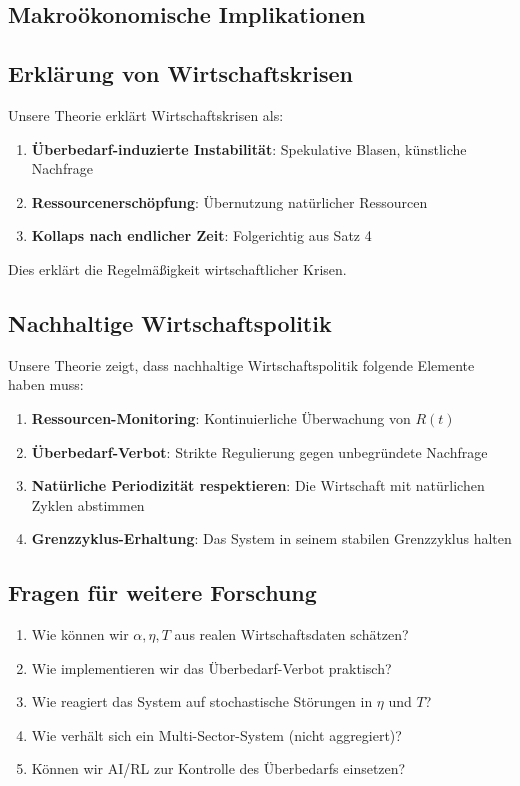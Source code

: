 \documentclass[a4paper, 12pt, twoside, openright]{report}
\theoremstyle{definition}
\theoremstyle{definition}
\begin{document}
\subsection{Makroökonomische Implikationen}

\subsection{Erklärung von Wirtschaftskrisen}

Unsere Theorie erklärt Wirtschaftskrisen als:

\begin{enumerate}
    \item \textbf{Überbedarf-induzierte Instabilität}: Spekulative Blasen, künstliche Nachfrage
    \item \textbf{Ressourcenerschöpfung}: Übernutzung natürlicher Ressourcen
    \item \textbf{Kollaps nach endlicher Zeit}: Folgerichtig aus Satz 4
\end{enumerate}

Dies erklärt die Regelmäßigkeit wirtschaftlicher Krisen.

\subsection{Nachhaltige Wirtschaftspolitik}

Unsere Theorie zeigt, dass nachhaltige Wirtschaftspolitik folgende Elemente haben muss:

\begin{enumerate}
    \item \textbf{Ressourcen-Monitoring}: Kontinuierliche Überwachung von $R(t)$
    \item \textbf{Überbedarf-Verbot}: Strikte Regulierung gegen unbegründete Nachfrage
    \item \textbf{Natürliche Periodizität respektieren}: Die Wirtschaft mit natürlichen Zyklen abstimmen
    \item \textbf{Grenzzyklus-Erhaltung}: Das System in seinem stabilen Grenzzyklus halten
\end{enumerate}

\subsection{Fragen für weitere Forschung}

\begin{enumerate}
    \item Wie können wir $\alpha, \eta, T$ aus realen Wirtschaftsdaten schätzen?
    \item Wie implementieren wir das Überbedarf-Verbot praktisch?
    \item Wie reagiert das System auf stochastische Störungen in $\eta$ und $T$?
    \item Wie verhält sich ein Multi-Sector-System (nicht aggregiert)?
    \item Können wir AI/RL zur Kontrolle des Überbedarfs einsetzen?
\end{enumerate}
\end{document}
